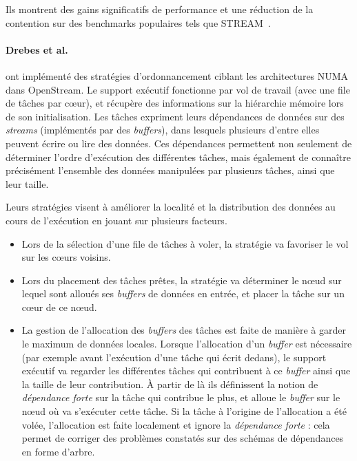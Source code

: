 Ils montrent des gains significatifs de performance et une réduction de la contention sur des benchmarks populaires tels que STREAM~\cite{mccalpin1995}.

\paragraph{Drebes et al.~\cite{Drebes2014}} ont implémenté des stratégies d'ordonnancement ciblant les architectures NUMA dans OpenStream.
Le support exécutif fonctionne par vol de travail (avec une file de tâches par cœur), et récupère des informations sur la hiérarchie mémoire lors de son initialisation.
Les tâches expriment leurs dépendances de données sur des \emph{streams} (implémentés par des \emph{buffers}), dans lesquels plusieurs d'entre elles peuvent écrire ou lire des données.
Ces dépendances permettent non seulement de déterminer l'ordre d'exécution des différentes tâches, mais également de connaître précisément l'ensemble des données manipulées par plusieurs tâches, ainsi que leur taille.

Leurs stratégies visent à améliorer la localité et la distribution des données au cours de l'exécution en jouant sur plusieurs facteurs.
\begin{itemize}
  \item Lors de la sélection d'une file de tâches à voler, la stratégie va favoriser le vol sur les cœurs voisins.
  \item Lors du placement des tâches prêtes, la stratégie va déterminer le nœud sur lequel sont alloués ses \emph{buffers} de données en entrée, et placer la tâche sur un cœur de ce nœud.
  \item La gestion de l'allocation des \emph{buffers} des tâches est faite de manière à garder le maximum de données locales.
Lorsque l'allocation d'un \emph{buffer} est nécessaire (par exemple avant l'exécution d'une tâche qui écrit dedans), le support exécutif va regarder les différentes tâches qui contribuent à ce \emph{buffer} ainsi que la taille de leur contribution. À partir de là ils définissent la notion de \emph{dépendance forte} sur la tâche qui contribue le plus, et alloue le \emph{buffer} sur le nœud où va s'exécuter cette tâche.
Si la tâche à l'origine de l'allocation a été volée, l'allocation est faite localement et ignore la \emph{dépendance forte} : cela permet de corriger des problèmes constatés sur des schémas de dépendances en forme d'arbre.
\end{itemize}

